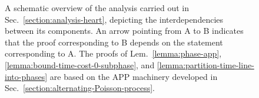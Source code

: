 \documentclass[11pt]{article}
\theoremstyle{definition}
\theoremstyle{plain}
\theoremstyle{definition}
\theoremstyle{plain}
\theoremstyle{definition}
\theoremstyle{plain}
\newcommand{\Sect}{Sec.}
\newcommand{\Lem}{Lem.}
\begin{document}
\begin{figure}[h]
\begin{center}
\end{center}
\caption{\label{figure:claim-chart}
A schematic overview of the analysis carried out in
\Sect{}~\ref{section:analysis-heart}, depicting the interdependencies between
its components.
An arrow pointing from A to B indicates that the proof corresponding
to B depends on the statement corresponding to A.
The proofs of \Lem{}\ \ref{lemma:phase-app},
\ref{lemma:bound-time-cost-0-subphase}, and
\ref{lemma:partition-time-line-into-phases} are based on the APP machinery
developed in \Sect{}~\ref{section:alternating-Poisson-process}.
}
\end{figure}
\end{document}

